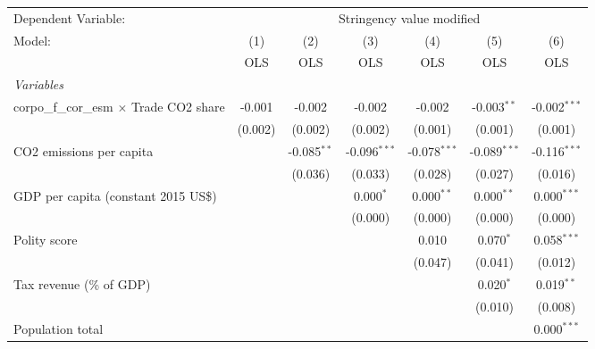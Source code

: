 
\begingroup
\centering
\begin{tabular}{lcccccc}
   \toprule
   Dependent Variable: & \multicolumn{6}{c}{Stringency value modified}\\
   Model:                                          & (1)     & (2)           & (3)            & (4)            & (5)            & (6)\\  
                                                   &  OLS    & OLS           & OLS            & OLS            & OLS            & OLS\\  
   \midrule
   \emph{Variables}\\
   corpo\_f\_cor\_esm $\times$ Trade CO2 share     & -0.001  & -0.002        & -0.002         & -0.002         & -0.003$^{**}$  & -0.002$^{***}$\\   
                                                   & (0.002) & (0.002)       & (0.002)        & (0.001)        & (0.001)        & (0.001)\\   
   CO2 emissions per capita                        &         & -0.085$^{**}$ & -0.096$^{***}$ & -0.078$^{***}$ & -0.089$^{***}$ & -0.116$^{***}$\\   
                                                   &         & (0.036)       & (0.033)        & (0.028)        & (0.027)        & (0.016)\\   
   GDP per capita (constant 2015 US\$)             &         &               & 0.000$^{*}$    & 0.000$^{**}$   & 0.000$^{**}$   & 0.000$^{***}$\\   
                                                   &         &               & (0.000)        & (0.000)        & (0.000)        & (0.000)\\   
   Polity score                                    &         &               &                & 0.010          & 0.070$^{*}$    & 0.058$^{***}$\\   
                                                   &         &               &                & (0.047)        & (0.041)        & (0.012)\\   
   Tax revenue (\% of GDP)                         &         &               &                &                & 0.020$^{*}$    & 0.019$^{**}$\\   
                                                   &         &               &                &                & (0.010)        & (0.008)\\   
   Population total                                &         &               &                &                &                & 0.000$^{***}$\\   

\end{tabular}
